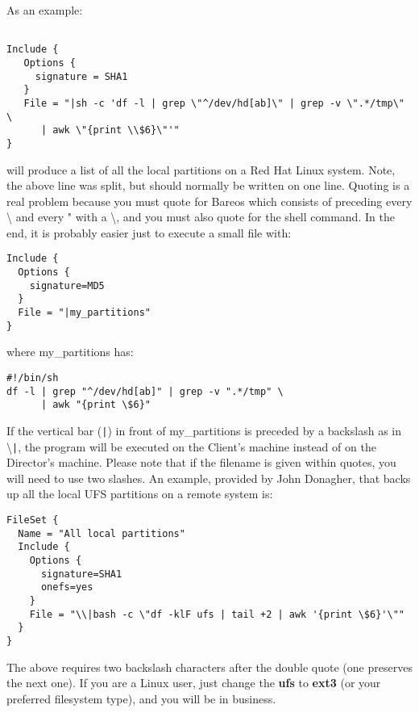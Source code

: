 \begin{itemize}
   As an  example:

\footnotesize
\begin{verbatim}

Include {
   Options {
     signature = SHA1
   }
   File = "|sh -c 'df -l | grep \"^/dev/hd[ab]\" | grep -v \".*/tmp\" \
      | awk \"{print \\$6}\"'"
}
\end{verbatim}
\normalsize

   will produce a list of all the local partitions on a Red Hat Linux system.
   Note, the above line was split, but should normally  be written on one line.
   Quoting is a real problem because you must quote for Bareos  which consists of
   preceding every \textbackslash{} and every " with a \textbackslash{}, and
   you must also quote for the shell command. In the end, it is probably  easier
   just to execute a small file with:


\footnotesize
\begin{verbatim}
Include {
  Options {
    signature=MD5
  }
  File = "|my_partitions"
}
\end{verbatim}
\normalsize

   where my\_partitions has:

\footnotesize
\begin{verbatim}
#!/bin/sh
df -l | grep "^/dev/hd[ab]" | grep -v ".*/tmp" \
      | awk "{print \$6}"
\end{verbatim}
\normalsize

   If the vertical bar (\verb+|+) in front of my\_partitions is preceded by a
   backslash as in \textbackslash{}\verb+|+, the program will be executed on the
   Client's machine instead of on the Director's machine.
   Please note that if the filename is given within quotes, you
   will need to use two slashes.  An example, provided by John Donagher,
   that backs up all the local UFS partitions on a remote system is:

\footnotesize
\begin{verbatim}
FileSet {
  Name = "All local partitions"
  Include {
    Options {
      signature=SHA1
      onefs=yes
    }
    File = "\\|bash -c \"df -klF ufs | tail +2 | awk '{print \$6}'\""
  }
}
\end{verbatim}
\normalsize

   The above requires two backslash characters after the double quote (one
   preserves  the next one). If you are a Linux user, just change the {\bf ufs}
   to  {\bf ext3} (or your preferred filesystem type), and you will be in
   business.


\end{itemize}
